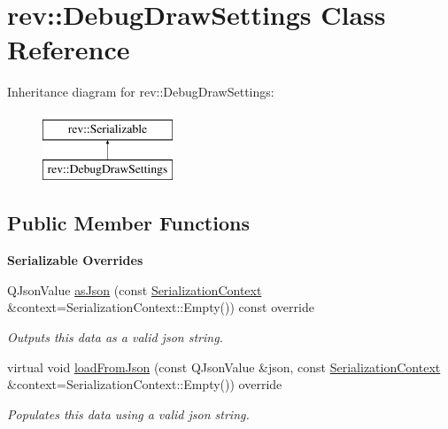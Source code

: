 \hypertarget{classrev_1_1_debug_draw_settings}{}\section{rev\+::Debug\+Draw\+Settings Class Reference}
\label{classrev_1_1_debug_draw_settings}
Inheritance diagram for rev\+::Debug\+Draw\+Settings\+:\begin{figure}[H]
\begin{center}
\leavevmode
\includegraphics[height=2.000000cm]{classrev_1_1_debug_draw_settings}
\end{center}
\end{figure}
\subsection*{Public Member Functions}
\begin{Indent}\textbf{ Serializable Overrides}\par
\begin{DoxyCompactItemize}
\item 
\mbox{\label{classrev_1_1_debug_draw_settings_a6e8d13b7356e3f6999484982f1bd2004}} 
Q\+Json\+Value \mbox{\hyperlink{classrev_1_1_debug_draw_settings_a6e8d13b7356e3f6999484982f1bd2004}{as\+Json}} (const \mbox{\hyperlink{structrev_1_1_serialization_context}{Serialization\+Context}} \&context=Serialization\+Context\+::\+Empty()) const override
\begin{DoxyCompactList}\small\item\em Outputs this data as a valid json string. \end{DoxyCompactList}\item 
\mbox{\label{classrev_1_1_debug_draw_settings_acef39f284847608fa75d93df1b4a1665}} 
virtual void \mbox{\hyperlink{classrev_1_1_debug_draw_settings_acef39f284847608fa75d93df1b4a1665}{load\+From\+Json}} (const Q\+Json\+Value \&json, const \mbox{\hyperlink{structrev_1_1_serialization_context}{Serialization\+Context}} \&context=Serialization\+Context\+::\+Empty()) override
\begin{DoxyCompactList}\small\item\em Populates this data using a valid json string. \end{DoxyCompactList}\end{DoxyCompactItemize}
\end{Indent}
